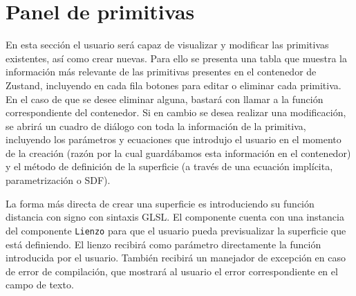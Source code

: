 \section{Panel de primitivas}
En esta sección el usuario será capaz de visualizar y modificar las primitivas existentes, así como crear nuevas. Para ello se presenta una tabla que muestra la información más relevante de las primitivas presentes en el contenedor de Zustand, incluyendo en cada fila botones para editar o eliminar cada primitiva. En el caso de que se desee eliminar alguna, bastará con llamar a la función correspondiente del contenedor. Si en cambio se desea realizar una modificación, se abrirá un cuadro de diálogo con toda la información de la primitiva, incluyendo los parámetros y ecuaciones que introdujo el usuario en el momento de la creación (razón por la cual guardábamos esta información en el contenedor) y el método de definición de la superficie (a través de una ecuación implícita, parametrización o SDF).\newline

La forma más directa de crear una superficie es introduciendo su función distancia con signo con sintaxis GLSL. El componente cuenta con una instancia del componente \texttt{Lienzo} para que el usuario pueda previsualizar la superficie que está definiendo. El lienzo recibirá como parámetro directamente la función introducida por el usuario. También recibirá un manejador de excepción en caso de error de compilación, que mostrará al usuario el error correspondiente en el campo de texto.

